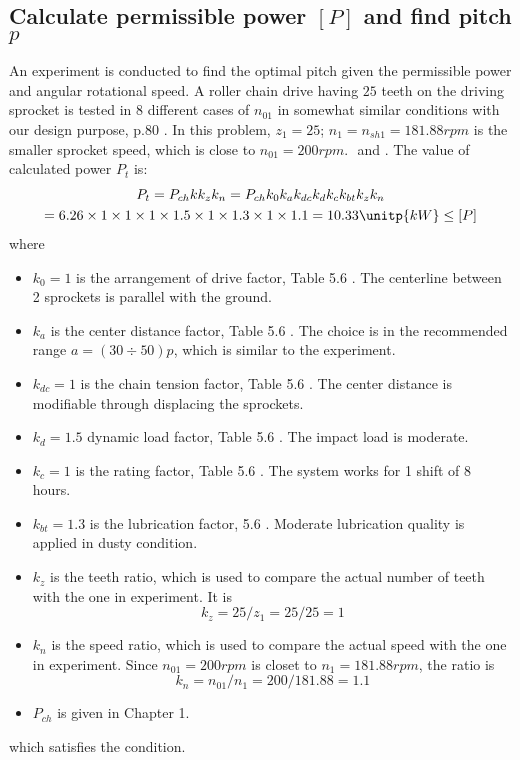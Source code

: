 \subsection{Calculate permissible power $ [P] $ and find pitch $ p $}

An experiment is conducted to find the optimal pitch given the permissible power and angular rotational speed. A roller chain drive having $ 25 $ teeth on the driving sprocket is tested in 8 different cases of $ n_{01} $ in somewhat similar conditions with our design purpose, p.80 \cite{tk1}. In this problem, $ z_1=25 $; $ n_1=n_{sh1}=181.88\unit{rpm} $ is the smaller sprocket speed, which is close to $ n_{01}=200\unit{rpm} $.  $  $ and $   $. The value of calculated power $ P_t $ is:
\begin{multline*}
P_t=P_{ch}kk_zk_n=P_{ch}k_0k_ak_{dc}k_dk_ck_{bt}k_zk_n\\
=6.26\times 1\times 1\times 1\times 1.5\times 1\times 1.3\times 1\times 1.1=10.33\unitp{kW}\leq[P]
\end{multline*}
where
\begin{itemize}
	\item $ k_0 = 1 $ is the arrangement of drive factor, Table 5.6 \cite{tk1}. The centerline between 2 sprockets is parallel with the ground.
	\item $ k_a $ is the center distance factor, Table 5.6 \cite{tk1}. The choice is in the recommended range $ a= (30\div 50)p $, which is similar to the experiment.
	\item $ k_{dc} =1 $ is the chain tension  factor, Table 5.6 \cite{tk1}. The center distance is modifiable through displacing the sprockets.
	\item $ k_d = 1.5 $ dynamic load factor, Table 5.6 \cite{tk1}. The impact load is moderate.
	\item $ k_c = 1 $ is the rating factor, Table 5.6 \cite{tk1}. The system works for 1 shift of 8 hours.
	\item $ k_{bt} =1.3 $ is the lubrication factor, 5.6 \cite{tk1}. Moderate lubrication quality is applied in dusty condition.
	\item $ k_z $ is the teeth ratio, which is used to compare the actual number of teeth with the one in experiment. It is
	\[k_z = {25}/{z_1} = 25/25 = 1\]
	\item $ k_n $ is the speed ratio, which is used to compare the actual speed with the one in experiment. Since $ n_{01}= 200\unit{rpm} $ is closet to $ n_1= 181.88\unit{rpm} $, the ratio is
	\[ k_n = n_{01}/n_1 = 200/181.88= 1.1\]
	\item $ P_{ch} $ is given in Chapter 1.
\end{itemize}
which satisfies the condition.


